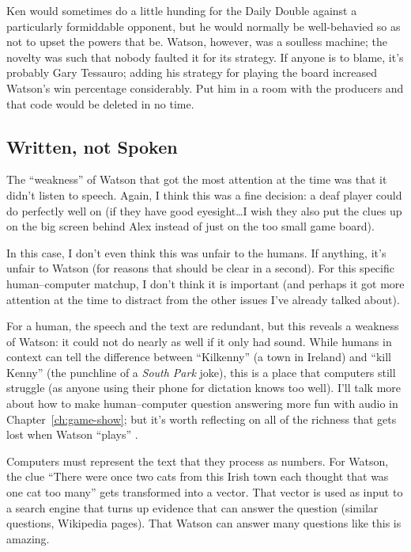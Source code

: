 Ken would sometimes do a little hunding for the Daily Double against a
particularly formiddable opponent, but he would normally be
well-behavied so as not to upset the powers that be.
%
Watson, however, was a soulless machine; the novelty was such that
nobody faulted it for its strategy.
%
If anyone is to blame, it's probably Gary Tessauro; adding his
strategy for playing the board increased Watson's win percentage
considerably.
%
Put him in a room with the \jeopardy{} producers and that code would
be deleted in no time.

\subsection{Written, not Spoken}

The ``weakness'' of Watson that got the most attention at the time was
that it didn't listen to speech.
%
Again, I think this was a fine decision: a deaf player could do
perfectly well on \jeopardy{} (if they have good eyesight\dots I
wish they also put the clues up on the big screen behind Alex
instead of just on the too small game board).

In this case, I don't even think this was unfair to the humans.
%
If anything, it's unfair to Watson (for reasons that should be clear
in a second).
%
For this specific human--computer matchup, I don't think it is
important (and perhaps it got more attention at the time to distract from the
other issues I've already talked about).

For a human, the speech and the text are redundant, but this reveals a
weakness of Watson: it could not do nearly as well if it only had
sound.
%
While humans in context can tell the difference between ``Kilkenny'' (a town in
Ireland) and ``kill Kenny'' (the punchline of a \textit{South Park}
joke), this is a place that computers still struggle (as anyone using
their phone for dictation knows too well).
%
I'll talk more about how to make human--computer question answering
more fun with audio in Chapter~\ref{ch:game-show}; but it's worth
reflecting on all of the richness that gets lost when Watson ``plays''
\jeopardyp{}.

Computers must represent the text that they process as numbers.
%
For Watson, the clue ``There were once two cats from this Irish town
each thought that was one cat too many'' gets transformed into a
vector.
%
That vector is used as input to a search engine that turns up evidence
that can answer the question (similar questions, Wikipedia pages).
%
That Watson can answer many questions like this is amazing.

